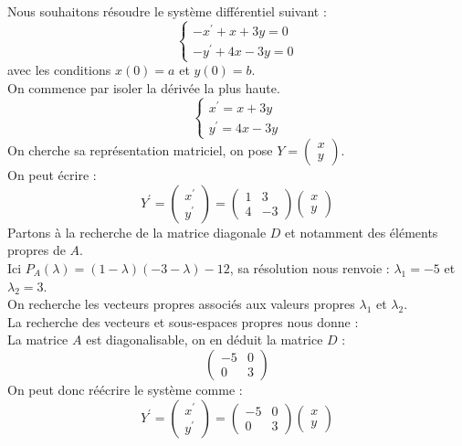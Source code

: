 \begin{ex}
Nous souhaitons résoudre le système différentiel suivant :
$$\begin{cases}
-x^{\prime}+x+3y = 0\\
-y^{\prime}+4x-3y = 0
\end{cases}$$
avec les conditions $x(0)=a$ et $y(0)=b$.\\
On commence par isoler la dérivée la plus haute.
$$\begin{cases}
x^{\prime}=x+3y\\
y^{\prime}=4x-3y
\end{cases}$$
On cherche sa représentation matriciel, on pose $Y=\begin{pmatrix}x\\y\end{pmatrix}$.\\
On peut écrire :
$$Y^{\prime}=\begin{pmatrix}x^{\prime}\\y^{\prime}\end{pmatrix}=\begin{pmatrix}1&3\\4&-3\end{pmatrix}\begin{pmatrix}x\\y\end{pmatrix}$$
Partons à la recherche de la matrice diagonale $D$ et notamment des éléments propres de $A$.\\
Ici $P_A(\lambda)=(1-\lambda)(-3-\lambda)-12$, sa résolution nous renvoie : $\lambda_1=-5$ et $\lambda_2=3$.\\
On recherche les vecteurs propres associés aux valeurs propres $\lambda_1$ et $\lambda_2$.\\
La recherche des vecteurs et sous-espaces propres nous donne :\\
La matrice $A$ est diagonalisable, on en déduit la matrice $D$ :
$$\begin{pmatrix}-5&0\\0&3\end{pmatrix}$$
On peut donc réécrire le système comme :
$$Y^{\prime}=\begin{pmatrix}x^{\prime}\\y^{\prime}\end{pmatrix}=\begin{pmatrix}-5&0\\0&3\end{pmatrix}\begin{pmatrix}x\\y\end{pmatrix}$$

\end{ex}
